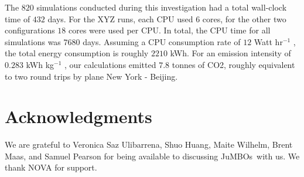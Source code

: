 \documentclass[submission,phys]{lib/SciPost}
\newcommand{\jumbos}{\mbox{JuMBOs}}
\begin{document}
The $820$ simulations conducted during this investigation had a total
wall-clock time of $432$ days. For the XYZ runs, each CPU used $6$
cores, for the other two configurations $18$ cores were used per
CPU. In total, the CPU time for all simulations was $7680$
days. Assuming a CPU consumption rate of $12$ Watt hr$^{-1}$
\cite{2020NatAs...4..819P}, the total energy consumption is roughly
$2210$ kWh. For an emission intensity of $0.283$ kWh kg$^{-1}$
\cite{doi:10.1002/cpe.3489}, our calculations emitted $7.8$ tonnes of
CO2, roughly equivalent to two round trips by plane New York -
Beijing.

\section*{Acknowledgments}
We are grateful to Veronica Saz Ulibarrena, Shuo Huang, Maite Wilhelm,
Brent Maas, and Samuel Pearson for being available to discussing
\jumbos\, with us.
We thank NOVA for support.


%
\end{document}
